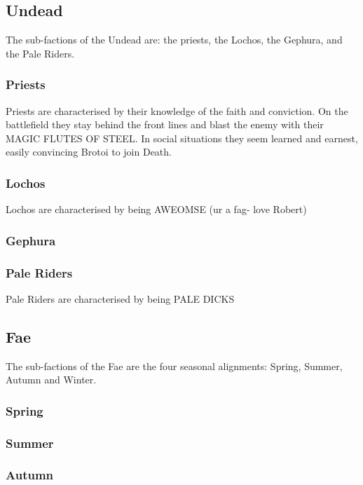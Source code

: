 \documentclass{report}
\begin{document}
\subsection{Undead}
The sub-factions of the Undead are: the priests, the Lochos, the Gephura, and the Pale Riders.

\subsubsection{Priests}
Priests are characterised by their knowledge of the faith and conviction. On the battlefield they stay behind the front lines and blast the enemy with their MAGIC FLUTES OF STEEL.%
In social situations they seem learned and earnest, easily convincing Brotoi to join Death.

\subsubsection{Lochos}
Lochos are characterised by being AWEOMSE (ur a fag- love Robert)

\subsubsection{Gephura}

\subsubsection{Pale Riders}
Pale Riders are characterised by being PALE DICKS


\subsection{Fae}
The sub-factions of the Fae are the four seasonal alignments: Spring, Summer, Autumn and Winter.

\subsubsection{Spring}

\subsubsection{Summer}

\subsubsection{Autumn}
\end{document}
